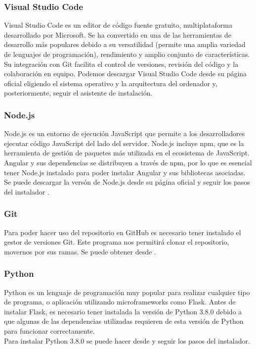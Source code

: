 \subsubsection{Visual Studio Code}
Visual Studio Code es un editor de código fuente gratuito, multiplataforma desarrollado por Microsoft. Se ha convertido en una de las herramientas de desarrollo más populares debido a su versatilidad (permite una amplia variedad de lenguajes de programación), rendimiento y amplio conjunto de características. Su integración con Git facilita el control de versiones, revisión del código y la colaboración en equipo. Podemos descargar Visual Studio Code desde su página oficial \cite{visualStudioCode:latex} eligiendo el sistema operativo y la arquitectura del ordenador y, posteriormente, seguir el asistente de instalación.

\subsubsection{Node.js}
Node.js es un entorno de ejecución JavaScript que permite a los desarrolladores ejecutar código JavaScript del lado del servidor. Node.js incluye npm, que es la herramienta de gestión de paquetes más utilizada en el ecosistema de JavaScript. Angular y sus dependencias se distribuyen a través de npm, por lo que es esencial tener Node.js instalado para poder instalar Angular y sus bibliotecas asociadas. Se puede descargar la versón de Node.js desde su página oficial y seguir los pasos del instalador \cite{nodejs:latex}.

\subsubsection{Git}
Para poder hacer uso del repositorio en GitHub es necesario tener instalado el gestor de versiones Git. Este programa nos permitirá clonar el repositorio, movernos por sus ramas. Se puede obtener desde \cite{git:latex}.

\subsubsection{Python}
Python es un lenguaje de programación muy popular para realizar cualquier tipo de programa, o aplicación utilizando microframeworks como Flask. Antes de instalar Flask, es necesario tener instalada la versión de Python 3.8.0 debido a que algunas de las dependencias utilizadas requieren de esta versión de Python para funcionar correctamente. \\
Para instalar Python 3.8.0 se puede hacer desde \cite{python:latex} y seguir los pasos del instalador.

